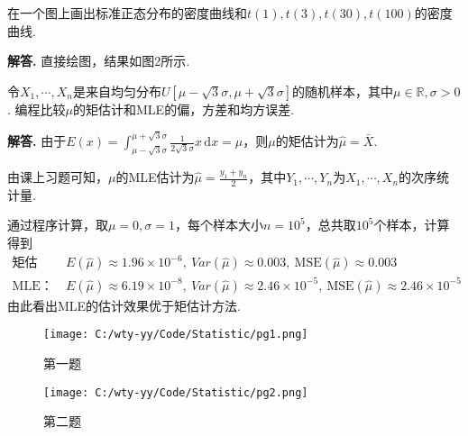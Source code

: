 \documentclass[12pt, a4paper, oneside]{ctexart}
\newcounter{problem}  %
\newcounter{problem*}  %
\newenvironment{problem*}{\stepcounter{problem*}\par\noindent\textbf{编程作业\arabic{problem*}. }}{\smallskip\par}
\newenvironment{solution}{\par\noindent\textbf{解答. }}{\smallskip\par}
\def\R{\mathbb{R}}          %
\def\d{\mathrm{d}}          %
\begin{document}
\begin{problem*}
    在一个图上画出标准正态分布的密度曲线和$t(1), t(3), t(30), t(100)$的密度曲线.
\end{problem*}
\begin{solution}
    直接绘图，结果如图2所示.
\end{solution}
\begin{problem*}
    令$X_1,\cdots, X_n$是来自均匀分布$U[\mu-\sqrt{3}\sigma, \mu+\sqrt{3}\sigma]$的随机样本，其中$\mu\in\R, \sigma > 0$. 编程比较$\mu$的矩估计和MLE的偏，方差和均方误差.
\end{problem*}
\begin{solution}
    由于$E(x) = \int_{\mu-\sqrt{3}\sigma}^{\mu+\sqrt{3}\sigma}\frac{1}{2\sqrt{3}\sigma}x\,\d x=\mu$，则$\mu$的矩估计为$\hat{\mu} = \bar{X}$.

    由课上习题可知，$\mu$的MLE估计为$\hat{\mu}=\frac{y_1+y_n}{2}$，其中$Y_1,\cdots,Y_n$为$X_1,\cdots,X_n$的次序统计量.

    通过程序计算，取$\mu = 0,\sigma =1$，每个样本大小$n=10^5$，总共取$10^5$个样本，计算得到
    \begin{align*}
        \text{矩估计：}&\ E(\hat{\mu}) \approx 1.96\times 10^{-6},\ Var(\hat{\mu}) \approx 0.003,\ \text{MSE}(\hat{\mu}) \approx 0.003\\
        \text{MLE：}&\ E(\hat{\mu}) \approx 6.19\times 10^{-8},\ Var(\hat{\mu}) \approx 2.46\times 10^{-5},\ \text{MSE}(\hat{\mu}) \approx 2.46\times 10^{-5}
    \end{align*}
    由此看出MLE的估计效果优于矩估计方法.
\end{solution}
\begin{figure}[htbp]
    \centering
    \texttt{[image: C:/wty-yy/Code/Statistic/pg1.png]}
    \caption{第一题}
\end{figure}
\begin{figure}[htbp]
    \centering
    \texttt{[image: C:/wty-yy/Code/Statistic/pg2.png]}
    \caption{第二题}
\end{figure}

\iffalse
\centerline{
    \texttt{[image: figure.png]}
}
\renewcommand\arraystretch{0.8} %
\begin{table}[!htbp] %
    \centering %
    \begin{tabular}{p{1cm}<{\centering}p{1cm}<{\centering}p{3cm}<{\centering}p{5cm}<{\centering}} %
        \toprule
        $x_i$ & $f[x_1]$ & $f[x_i,x_{i+1}]$ & $f[x_i,x_{i+1},x_{i+2}]$ \\
        \midrule
        $x_0$ & $f(x_0)$ &                  &                          \\
        $x_0$ & $f(x_0)$ & $f'(x_0)$        &                          \\
        $x_0$ & $f(x_1)$ & $\frac{f(x_1)-f(x_0)}{x_1-x_0}$ & $\frac{f(x_1)-f(x_0)}{(x_1-x_0)^2}-\frac{f'(x_0)}{x_1-x_0}$\\
        \bottomrule
    \end{tabular}
\end{table}

\def\Log{\text{Log}} %
$\Log$ %
\fi
\end{document}
